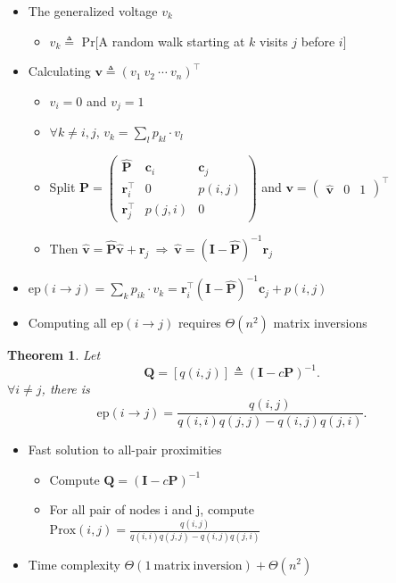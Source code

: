 \documentclass{article}
\newtheorem*{mythm*}{Theorem}
\begin{document}
\begin{itemize}
\item The generalized voltage $v_k$
\begin{itemize}
\item $v_k \triangleq $ Pr[A random walk starting at $k$ visits $j$ before $i$]
\end{itemize}
\item Calculating $\bm{v} \triangleq (v_1\ v_2\ \cdots\ v_n)^\top$
\begin{itemize}
\item $v_i = 0$ and $v_j = 1$
\item $\forall k\neq i, j$, $v_k = \sum\limits_l p_{kl} \cdot v_l$
\item Split
$\bm{P} = \begin{pmatrix}
\hat{\bm{P}} & \bm{c}_i & \bm{c}_j \\
\bm{r}_i^\top & 0 & p(i,j) \\
\bm{r}_j^\top & p(j,i) & 0
\end{pmatrix}$
and $\bm{v} = \begin{pmatrix} \hat{\bm{v}} & 0 & 1 \end{pmatrix}^\top$
\item Then $\hat{\bm{v}} = \hat{\bm{P}} \hat{\bm{v}} + \bm{r}_j \ \Rightarrow\ \hat{\bm{v}} = (\bm{I} - \hat{\bm{P}})^{-1} \bm{r}_j$
\end{itemize}
\item $\mathrm{ep}(i\rightarrow j) = \sum\limits_k p_{ik} \cdot v_k = \bm{r}_i^\top (\bm{I} - \hat{\bm{P}})^{-1} \bm{c}_j + p(i,j)$
\item Computing all $\mathrm{ep}(i\rightarrow j)$ requires $\Theta(n^2)$ matrix inversions
\end{itemize}

\begin{mythm*}
Let
\[
\bm{Q} = \left[ q(i,j) \right] \triangleq (\bm{I} - c\bm{P})^{-1}.
\]
$\forall i\neq j$, there is
\[
\mathrm{ep}(i\rightarrow j) = \frac{q(i,j)}{q(i,i)q(j,j) - q(i,j)q(j,i)}.
\]
\end{mythm*}

\begin{itemize}
\item Fast solution to all-pair proximities
\begin{itemize}
\item Compute $\bm{Q} = (\bm{I} - c\bm{P})^{-1}$
\item For all pair of nodes i and j, compute $\mathrm{Prox}(i,j) = \frac{q(i,j)}{q(i,i)q(j,j) - q(i,j)q(j,i)}$
\end{itemize}
\item Time complexity $\Theta(\mathrm{1\ matrix\ inversion}) + \Theta(n^2)$
\end{itemize}
\end{document}
